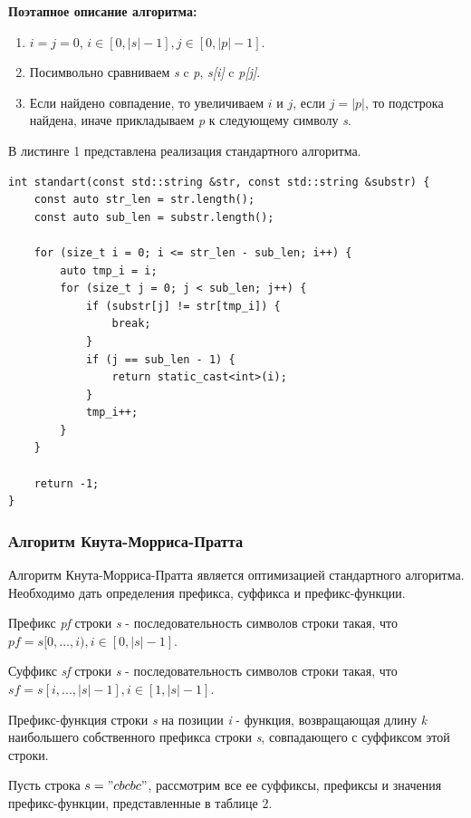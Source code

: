 \documentclass[a4paper,12pt]{article}
\begin{document}
\textbf{Поэтапное описание алгоритма:}
\begin{enumerate}
\item $i = j = 0$, $i \in [0, |s|-1], j \in [0, |p| - 1]$.
\item Посимвольно сравниваем \textit{s} c \textit{p}, \textit{s[i]} c \textit{p[j]}.
\item Если найдено совпадение, то увеличиваем $i$ и $j$, если $j=|p|$, то подстрока найдена, иначе прикладываем \textit{p} к следующему символу \textit{s}.
\end{enumerate}
\newpage
В листинге 1 представлена реализация стандартного алгоритма.
\begin{lstlisting}[frame=single,caption=Стандартный алгоритм, breaklines]
int standart(const std::string &str, const std::string &substr) {
    const auto str_len = str.length();
    const auto sub_len = substr.length();

    for (size_t i = 0; i <= str_len - sub_len; i++) {
        auto tmp_i = i;
        for (size_t j = 0; j < sub_len; j++) {
            if (substr[j] != str[tmp_i]) {
                break;
            }
            if (j == sub_len - 1) {
                return static_cast<int>(i);
            }
            tmp_i++;
        }
    }

    return -1;
}
\end{lstlisting}

\subsubsection{Алгоритм Кнута-Морриса-Пратта}

Алгоритм Кнута-Морриса-Пратта является оптимизацией стандартного алгоритма. Необходимо дать определения префикса, суффикса и префикс-функции.

Префикс \textit{pf} строки \textit{s} - последовательность символов строки такая, что $pf=s[0,...,i), i \in [0, |s|-1]$.

Суффикс \textit{sf} строки \textit{s} - последовательность символов строки такая, что $sf=s[i,...,|s|-1], i \in [1, |s|-1]$.

Префикс-функция строки \textit{s} на позиции \textit{i} - функция, возвращающая длину \textit{k} наибольшего собственного префикса строки \textit{s}, совпадающего с суффиксом этой строки.

Пусть строка $s = "cbcbc"$, рассмотрим все ее суффиксы, префиксы и значения префикс-функции, представленные в таблице 2.
\end{document}

